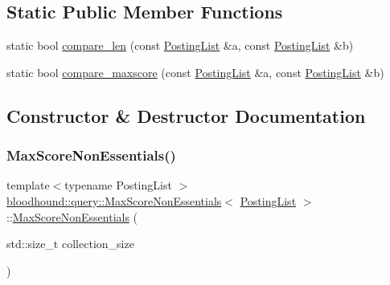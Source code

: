 \subsection*{Static Public Member Functions}
\begin{DoxyCompactItemize}
\item 
static bool \hyperlink{classbloodhound_1_1query_1_1MaxScoreNonEssentials_a2ea9f46aa9175fe20243e7cb2886f1f0}{compare\+\_\+len} (const \hyperlink{classbloodhound_1_1PostingList}{Posting\+List} \&a, const \hyperlink{classbloodhound_1_1PostingList}{Posting\+List} \&b)
\item 
static bool \hyperlink{classbloodhound_1_1query_1_1MaxScoreNonEssentials_a758b1b31a3ec9b563978ed7a11e3987c}{compare\+\_\+maxscore} (const \hyperlink{classbloodhound_1_1PostingList}{Posting\+List} \&a, const \hyperlink{classbloodhound_1_1PostingList}{Posting\+List} \&b)
\end{DoxyCompactItemize}


\subsection{Constructor \& Destructor Documentation}
\mbox{\label{classbloodhound_1_1query_1_1MaxScoreNonEssentials_a4ca74b906a87120ffcad3bc6edcc148c}} 
\subsubsection{\texorpdfstring{Max\+Score\+Non\+Essentials()}{MaxScoreNonEssentials()}}
{\footnotesize\ttfamily template$<$typename Posting\+List $>$ \\
\hyperlink{classbloodhound_1_1query_1_1MaxScoreNonEssentials}{bloodhound\+::query\+::\+Max\+Score\+Non\+Essentials}$<$ \hyperlink{classbloodhound_1_1PostingList}{Posting\+List} $>$\+::\hyperlink{classbloodhound_1_1query_1_1MaxScoreNonEssentials}{Max\+Score\+Non\+Essentials} (\begin{DoxyParamCaption}\item[{std\+::size\+\_\+t}]{collection\+\_\+size }\end{DoxyParamCaption})\hspace{0.3cm}{\ttfamily [inline]}}



